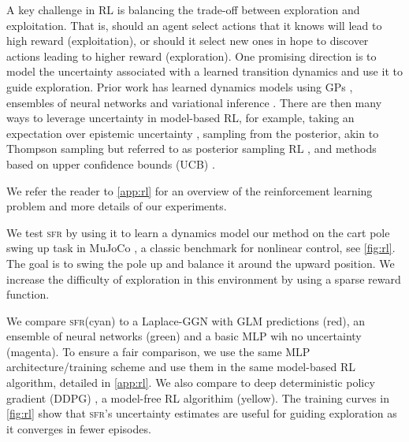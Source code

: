 \documentclass{article}
\newcommand{\our}{\textsc{sfr}\xspace}
\begin{document}
A key challenge in RL is balancing the trade-off between exploration and exploitation.
That is, should an agent select actions that it knows will lead to high reward (exploitation), or should it
select new ones in hope to discover actions leading to higher reward (exploration).
One promising direction is to model the uncertainty associated with a learned transition dynamics and use it to guide exploration.
Prior work has learned dynamics models using GPs \cite{deisenrothPILCO2011,kamtheDataEfficient2018},
ensembles of neural networks \cite{curiEfficient2020,chuaDeepReinforcementLearning2018}
and variational inference \cite{galImproving2016,houthooftVIME2017}.
There are then many ways to leverage uncertainty in model-based RL, for example,
taking an expectation over epistemic uncertainty  \cite{deisenrothPILCO2011,kamtheDataEfficient2018,chuaDeepReinforcementLearning2018},
sampling from the posterior, akin to Thompson sampling but referred to as posterior sampling RL
\cite{osbandMoreEfficientReinforcement2013},
and methods based on upper confidence bounds (UCB) \cite{curiEfficient2020}.


We refer the reader to \cref{app:rl} for an overview of the reinforcement learning problem and more details of our experiments.

We test \our by using it to learn a dynamics model
our method on the cart pole swing up task in MuJoCo \cite{todorov2012mujoco}, a classic benchmark for nonlinear control, see \cref{fig:rl}.
The goal is to swing the pole up and balance it around the upward position.
We increase the  difficulty of exploration in this environment by using a sparse reward function.


We compare \our (cyan) to a Laplace-GGN with GLM predictions (red), an ensemble of neural networks (green) and a basic MLP wih no uncertainty (magenta).
To ensure a fair comparison, we use the same MLP architecture/training scheme and use them in the same model-based RL algorithm, detailed in \cref{app:rl}.
We also compare to deep deterministic policy gradient (DDPG) \cite{lillicrapContinuousControlDeep2016}, a model-free RL algorithim (yellow).
The training curves in \cref{fig:rl} show that \our's uncertainty estimates are useful for guiding exploration as it converges in fewer episodes.

\end{document}
